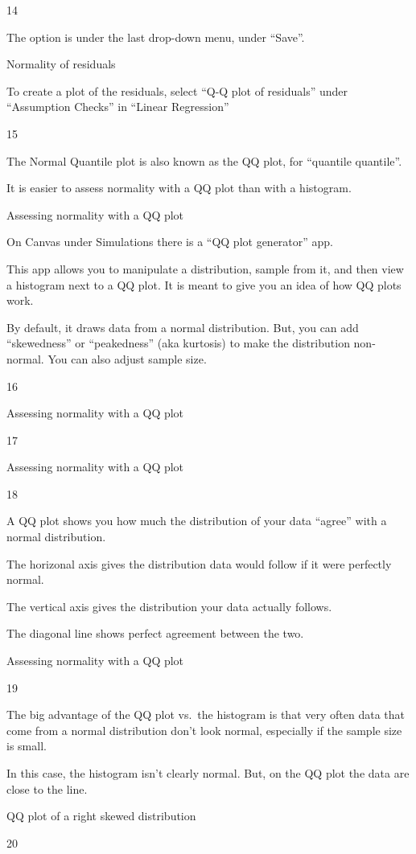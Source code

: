 \documentclass[
  letterpaper,
  DIV=11,
  numbers=noendperiod]{scrreprt}
\begin{document}
14

The option is under the last drop-down menu, under ``Save''.

Normality of residuals

To create a plot of the residuals, select ``Q-Q plot of residuals''
under ``Assumption Checks'' in ``Linear Regression''

15

The Normal Quantile plot is also known as the QQ plot, for ``quantile
quantile''.

It is easier to assess normality with a QQ plot than with a histogram.

Assessing normality with a QQ plot

On Canvas under Simulations there is a ``QQ plot generator'' app.

This app allows you to manipulate a distribution, sample from it, and
then view a histogram next to a QQ plot. It is meant to give you an idea
of how QQ plots work.

By default, it draws data from a normal distribution. But, you can add
``skewedness'' or ``peakedness'' (aka kurtosis) to make the distribution
non-normal. You can also adjust sample size.

16

Assessing normality with a QQ plot

17

Assessing normality with a QQ plot

18

A QQ plot shows you how much the distribution of your data ``agree''
with a normal distribution.

The horizonal axis gives the distribution data would follow if it were
perfectly normal.

The vertical axis gives the distribution your data actually follows.

The diagonal line shows perfect agreement between the two.

Assessing normality with a QQ plot

19

The big advantage of the QQ plot vs.~the histogram is that very often
data that come from a normal distribution don't look normal, especially
if the sample size is small.

In this case, the histogram isn't clearly normal. But, on the QQ plot
the data are close to the line.

QQ plot of a right skewed distribution

20
\end{document}
